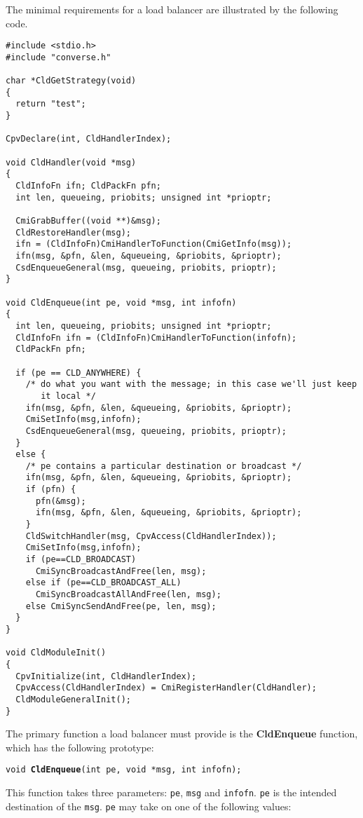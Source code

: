 The minimal requirements for a load balancer are illustrated by the
following code.

\begin{verbatim}
#include <stdio.h>
#include "converse.h"

char *CldGetStrategy(void)
{
  return "test";
}

CpvDeclare(int, CldHandlerIndex);

void CldHandler(void *msg)
{
  CldInfoFn ifn; CldPackFn pfn;
  int len, queueing, priobits; unsigned int *prioptr;
  
  CmiGrabBuffer((void **)&msg);
  CldRestoreHandler(msg);
  ifn = (CldInfoFn)CmiHandlerToFunction(CmiGetInfo(msg));
  ifn(msg, &pfn, &len, &queueing, &priobits, &prioptr);
  CsdEnqueueGeneral(msg, queueing, priobits, prioptr);
}

void CldEnqueue(int pe, void *msg, int infofn)
{
  int len, queueing, priobits; unsigned int *prioptr;
  CldInfoFn ifn = (CldInfoFn)CmiHandlerToFunction(infofn);
  CldPackFn pfn;

  if (pe == CLD_ANYWHERE) {
    /* do what you want with the message; in this case we'll just keep
       it local */
    ifn(msg, &pfn, &len, &queueing, &priobits, &prioptr);
    CmiSetInfo(msg,infofn);
    CsdEnqueueGeneral(msg, queueing, priobits, prioptr);
  }
  else {
    /* pe contains a particular destination or broadcast */
    ifn(msg, &pfn, &len, &queueing, &priobits, &prioptr);
    if (pfn) {
      pfn(&msg);
      ifn(msg, &pfn, &len, &queueing, &priobits, &prioptr);
    }
    CldSwitchHandler(msg, CpvAccess(CldHandlerIndex));
    CmiSetInfo(msg,infofn);
    if (pe==CLD_BROADCAST) 
      CmiSyncBroadcastAndFree(len, msg);
    else if (pe==CLD_BROADCAST_ALL)
      CmiSyncBroadcastAllAndFree(len, msg);
    else CmiSyncSendAndFree(pe, len, msg);
  }
}

void CldModuleInit()
{
  CpvInitialize(int, CldHandlerIndex);
  CpvAccess(CldHandlerIndex) = CmiRegisterHandler(CldHandler);
  CldModuleGeneralInit();
}
\end{verbatim}

The primary function a load balancer must provide is the {\bf
CldEnqueue} function, which has the following prototype:

{\tt void {\bf CldEnqueue}(int pe, void *msg, int infofn);}

This function takes three parameters: {\tt pe},
{\tt msg} and {\tt infofn}.  {\tt pe} is the intended destination of
the {\tt msg}. {\tt pe} may take on one of the following values:

